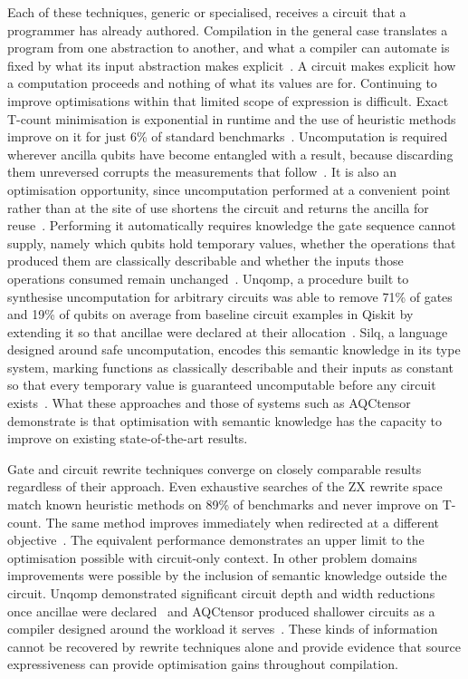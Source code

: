 Each of these techniques, generic or specialised, receives a circuit that a programmer has already authored.
Compilation in the general case translates a program from one abstraction to another, and what a compiler can automate is fixed by what its input abstraction makes explicit~\cite{aho2022abstractions}.
A circuit makes explicit how a computation proceeds and nothing of what its values are for.
Continuing to improve optimisations within that limited scope of expression is difficult.
Exact T-count minimisation is exponential in runtime and the use of heuristic methods improve on it for just 6\% of standard benchmarks~\cite{reducingtcount2019}.
Uncomputation is required wherever ancilla qubits have become entangled with a result, because discarding them unreversed corrupts the measurements that follow~\cite{bichsel2020silq}.
It is also an optimisation opportunity, since uncomputation performed at a convenient point rather than at the site of use shortens the circuit and returns the ancilla for reuse~\cite{paradis2021unqomp}.
Performing it automatically requires knowledge the gate sequence cannot supply, namely which qubits hold temporary values, whether the operations that produced them are classically describable and whether the inputs those operations consumed remain unchanged~\cite{paradis2021unqomp}.
Unqomp, a procedure built to synthesise uncomputation for arbitrary circuits was able to remove 71\% of gates and 19\% of qubits on average from baseline circuit examples in Qiskit by extending it so that ancillae were declared at their allocation~\cite{paradis2021unqomp}.
Silq, a language designed around safe uncomputation, encodes this semantic knowledge in its type system, marking functions as classically describable and their inputs as constant so that every temporary value is guaranteed uncomputable before any circuit exists~\cite{bichsel2020silq}.
What these approaches and those of systems such as AQCtensor demonstrate is that optimisation with semantic knowledge has the capacity to improve on existing state-of-the-art results.

Gate and circuit rewrite techniques converge on closely comparable results regardless of their approach.
Even exhaustive searches of the ZX rewrite space match known heuristic methods on 89\% of benchmarks and never improve on T-count.
The same method improves immediately when redirected at a different objective~\cite{fischbach2025exhaustivesearchzx}.
The equivalent performance demonstrates an upper limit to the optimisation possible with circuit-only context.
In other problem domains improvements were possible by the inclusion of semantic knowledge outside the circuit.
Unqomp demonstrated significant circuit depth and width reductions once ancillae were declared~\cite{paradis2021unqomp} and AQCtensor produced shallower circuits as a compiler designed around the workload it serves~\cite{AQCtensor2024}.
These kinds of information cannot be recovered by rewrite techniques alone and provide evidence that source expressiveness can provide optimisation gains throughout compilation.

